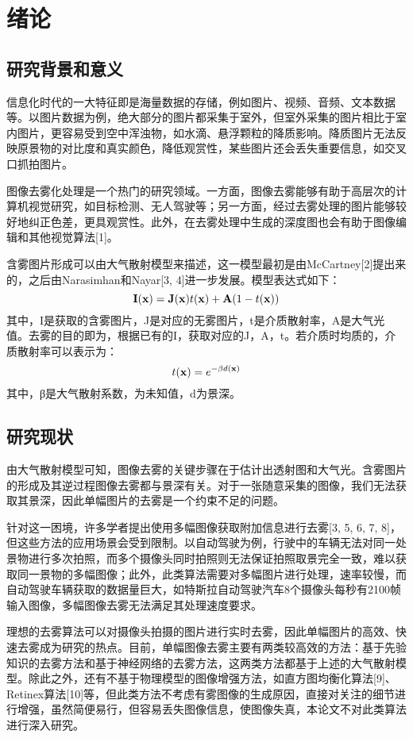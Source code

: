 \documentclass[a4paper, 12pt]{report}
\begin{document}
\chapter{绪论\quad}
\section{研究背景和意义\quad}
信息化时代的一大特征即是海量数据的存储，例如图片、视频、音频、文本数据等。以图片数据为例，绝大部分的图片都采集于室外，但室外采集的图片相比于室内图片，更容易受到空中浑浊物，如水滴、悬浮颗粒的降质影响。降质图片无法反映原景物的对比度和真实颜色，降低观赏性，某些图片还会丢失重要信息，如交叉口抓拍图片。

图像去雾化处理是一个热门的研究领域。一方面，图像去雾能够有助于高层次的计算机视觉研究，如目标检测、无人驾驶等；另一方面，经过去雾处理的图片能够较好地纠正色差，更具观赏性。此外，在去雾处理中生成的深度图也会有助于图像编辑和其他视觉算法[1]。

含雾图片形成可以由大气散射模型来描述，这一模型最初是由McCartney[2]提出来的，之后由Narasimhan和Nayar[3, 4]进一步发展。模型表达式如下：
\begin{equation}
{\bf I(x)} = {\bf J(x)}t{\bf (x)} + {\bf A}(1 - t{\bf (x)})
\end{equation}
其中，I是获取的含雾图片，J是对应的无雾图片，t是介质散射率，A是大气光值。去雾的目的即为，根据已有的I，获取对应的J，A，t。若介质时均质的，介质散射率可以表示为：
\begin{equation}
t{\bf (x)} = e^{-\beta d{\bf (x)}}
\end{equation}
其中，β是大气散射系数，为未知值，d为景深。

\section{研究现状\quad}
由大气散射模型可知，图像去雾的关键步骤在于估计出透射图和大气光。含雾图片的形成及其逆过程图像去雾都与景深有关。对于一张随意采集的图像，我们无法获取其景深，因此单幅图片的去雾是一个约束不足的问题。

针对这一困境，许多学者提出使用多幅图像获取附加信息进行去雾[3, 5, 6, 7, 8]，但这些方法的应用场景会受到限制。以自动驾驶为例，行驶中的车辆无法对同一处景物进行多次拍照，而多个摄像头同时拍照则无法保证拍照取景完全一致，难以获取同一景物的多幅图像；此外，此类算法需要对多幅图片进行处理，速率较慢，而自动驾驶车辆获取的数据量巨大，如特斯拉自动驾驶汽车8个摄像头每秒有2100帧输入图像，多幅图像去雾无法满足其处理速度要求。

理想的去雾算法可以对摄像头拍摄的图片进行实时去雾，因此单幅图片的高效、快速去雾成为研究的热点。目前，单幅图像去雾主要有两类较高效的方法：基于先验知识的去雾方法和基于神经网络的去雾方法，这两类方法都基于上述的大气散射模型。除此之外，还有不基于物理模型的图像增强方法，如直方图均衡化算法[9]、Retinex算法[10]等，但此类方法不考虑有雾图像的生成原因，直接对关注的细节进行增强，虽然简便易行，但容易丢失图像信息，使图像失真，本论文不对此类算法进行深入研究。
\end{document}
